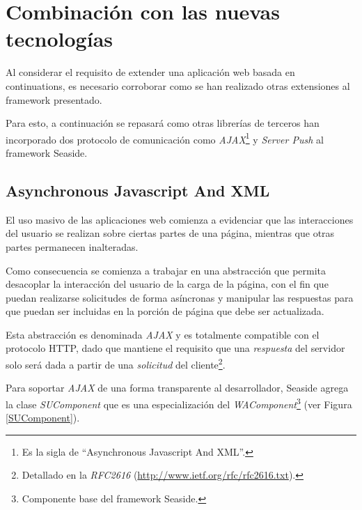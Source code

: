 \section{Combinación con las nuevas tecnologías}

Al considerar el requisito de extender una aplicación web basada en continuations, es necesario corroborar como se han realizado otras extensiones al framework presentado.

Para esto, a continuación se repasará como otras librerías de terceros han incorporado dos protocolo de comunicación como \emph{AJAX}\footnote{Es la sigla de ``Asynchronous Javascript And XML''.} y \emph{Server Push} al framework Seaside.


\subsection{Asynchronous Javascript And XML}

El uso masivo de las aplicaciones web comienza a evidenciar que las interacciones del usuario se realizan sobre ciertas partes de una página, mientras que otras partes permanecen inalteradas.

Como consecuencia se comienza a trabajar en una abstracción que permita desacoplar la interacción del usuario de la carga de la página, con el fin que puedan realizarse solicitudes de forma asíncronas y manipular las respuestas para que puedan ser incluidas en la porción de página que debe ser actualizada.

Esta abstracción es denominada \emph{AJAX} y es totalmente compatible con el protocolo HTTP, dado que mantiene el requisito que una \emph{respuesta} del servidor solo será dada a partir de una \emph{solicitud} del cliente\footnote{Detallado en la \emph{RFC2616} (\url{http://www.ietf.org/rfc/rfc2616.txt}).}.


Para soportar \emph{AJAX} de una forma transparente al desarrollador, Seaside agrega la clase \emph{SUComponent} que es una especialización del \emph{WAComponent}\footnote{Componente base del framework Seaside.} (ver Figura \ref{SUComponent}).

